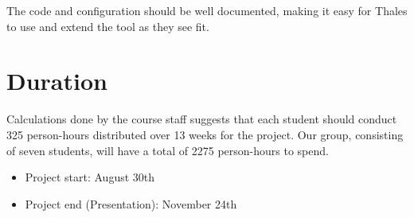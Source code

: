 The code and configuration should be well documented, making it easy for Thales to use and extend the tool as they see fit.


\section{Duration}
Calculations done by the course staff suggests that each student should conduct 325 person-hours distributed over 13 weeks for the project. Our group, consisting of seven students, will have a total of 2275 person-hours to spend.\\
\begin {itemize}
	\item Project start: August 30th
	\item Project end (Presentation): November 24th
\end{itemize}


